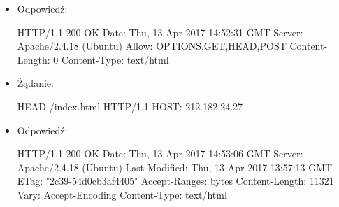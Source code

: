 \begin{itemize}
\begin{code}
\end{code}

\item Odpowiedź:

\begin{code}
HTTP/1.1 200 OK
Date: Thu, 13 Apr 2017 14:52:31 GMT
Server: Apache/2.4.18 (Ubuntu)
Allow: OPTIONS,GET,HEAD,POST
Content-Length: 0
Content-Type: text/html
\end{code}

\item Żądanie:

\begin{code}
HEAD /index.html HTTP/1.1
HOST: 212.182.24.27

\end{code}

\item Odpowiedź:

\begin{code}
HTTP/1.1 200 OK
Date: Thu, 13 Apr 2017 14:53:06 GMT
Server: Apache/2.4.18 (Ubuntu)
Last-Modified: Thu, 13 Apr 2017 13:57:13 GMT
ETag: "2c39-54d0cb3af4405"
Accept-Ranges: bytes
Content-Length: 11321
Vary: Accept-Encoding
Content-Type: text/html
\end{code}

\end{itemize}

